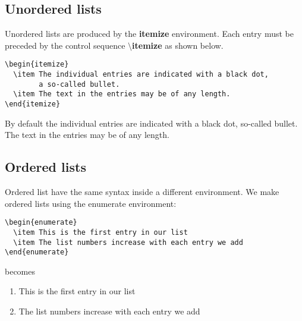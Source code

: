 \documentclass[12pt]{article}
\begin{document}
\subsection{Unordered lists}

Unordered lists are produced by the \textbf{itemize} environment. Each entry must be preceded by the control sequence $ \setminus $\textbf{itemize} as shown below.

\begin{verbatim}
\begin{itemize}
  \item The individual entries are indicated with a black dot, 
        a so-called bullet.
  \item The text in the entries may be of any length.
\end{itemize}
\end{verbatim}

By default the individual entries are indicated with a black dot, so-called bullet. The text in the entries may be of any length.

\subsection{Ordered lists}

Ordered list have the same syntax inside a different environment. We make ordered lists using the enumerate environment:

\begin{verbatim}
\begin{enumerate}
  \item This is the first entry in our list
  \item The list numbers increase with each entry we add
\end{enumerate}
\end{verbatim}

becomes 

\begin{enumerate}
  \item This is the first entry in our list
  \item The list numbers increase with each entry we add
\end{enumerate}
\end{document}

